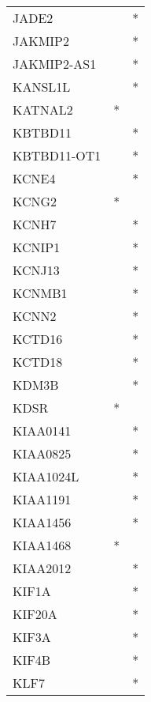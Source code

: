 \begin{longtable}{lcc}
JADE2           &                &          * \\
JAKMIP2         &                &          * \\
JAKMIP2-AS1     &                &          * \\
KANSL1L         &                &          * \\
KATNAL2         &              * &            \\
KBTBD11         &                &          * \\
KBTBD11-OT1     &                &          * \\
KCNE4           &                &          * \\
KCNG2           &              * &            \\
KCNH7           &                &          * \\
KCNIP1          &                &          * \\
KCNJ13          &                &          * \\
KCNMB1          &                &          * \\
KCNN2           &                &          * \\
KCTD16          &                &          * \\
KCTD18          &                &          * \\
KDM3B           &                &          * \\
KDSR            &              * &            \\
KIAA0141        &                &          * \\
KIAA0825        &                &          * \\
KIAA1024L       &                &          * \\
KIAA1191        &                &          * \\
KIAA1456        &                &          * \\
KIAA1468        &              * &            \\
KIAA2012        &                &          * \\
KIF1A           &                &          * \\
KIF20A          &                &          * \\
KIF3A           &                &          * \\
KIF4B           &                &          * \\
KLF7            &                &          * \\

\end{longtable}
